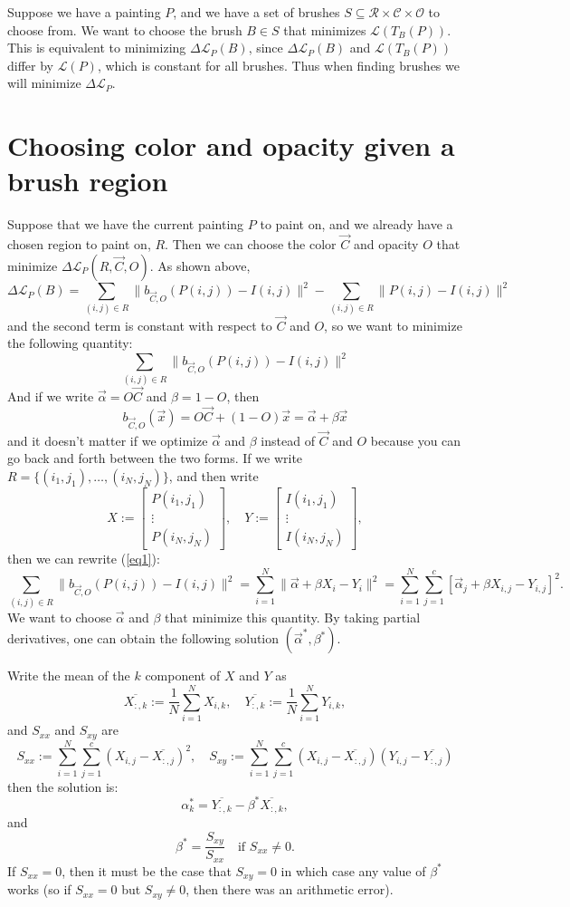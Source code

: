 \documentclass[12pt]{article}
\newcommand{\be}{\begin{equation}}
\newcommand{\ee}{\end{equation}}
\newcommand{\Loss}{\mathcal{L}}
\begin{document}
Suppose we have a painting $P$, and we have a set of brushes $S \subseteq \mathcal{R} \times \mathcal C \times \mathcal O$ to choose from. We want to choose the brush $B \in S$ that minimizes $\mathcal{L}(T_{B}(P))$. This is equivalent to minimizing $\Delta \mathcal{L}_P(B)$, since $\Delta \mathcal{L}_P(B)$ and $\mathcal{L}(T_{B}(P))$ differ by $\mathcal{L}(P)$, which is constant for all brushes. Thus when finding brushes we will minimize $\Delta \Loss_P$.

\section{Choosing color and opacity given a brush region}
Suppose that we have the current painting $P$ to paint on, and we already have a chosen region to paint on, $R$. Then we can choose the color $\vec C$ and opacity $O$ that minimize $\Delta \Loss_P(R,\vec C,O)$. As shown above,
\[
\Delta \mathcal{L}_P(B) = \sum_{(i,j) \in R} \| b_{\vec C,O}(P(i,j)) - I(i,j) \|^2 - \sum_{(i,j) \in R} \| P(i,j) - I(i,j) \|^2
\]
and the second term is constant with respect to $\vec C$ and $O$, so we want to minimize the following quantity:
\be \label{eq1}
\sum_{(i,j) \in R} \| b_{\vec C,O}(P(i,j)) - I(i,j) \|^2
\ee
And if we write $\vec \alpha = O\vec C$ and $\beta = 1-O$, then
\[
b_{\vec C,O}(\vec x) = O \vec C + (1-O) \vec x = \vec \alpha + \beta \vec x
\]
and it doesn't matter if we optimize $\vec \alpha$ and $\beta$ instead of $\vec C$ and $O$ because you can go back and forth between the two forms.
If we write $R = \{ (i_1,j_1), \dots, (i_N,j_N) \}$, and then write
\[
X := \begin{bmatrix}
P(i_1,j_1) \\
\vdots \\
P(i_N,j_N)
\end{bmatrix}, \quad
Y := \begin{bmatrix}
I(i_1,j_1) \\
\vdots \\
I(i_N,j_N)
\end{bmatrix},
\]
then we can rewrite (\ref{eq1}):
\[
\sum_{(i,j) \in R} \| b_{\vec C,O}(P(i,j)) - I(i,j) \|^2
=
\sum_{i=1}^N \| \vec \alpha + \beta X_i - Y_i \|^2
=
\sum_{i=1}^N \sum_{j=1}^c [\vec \alpha_j + \beta X_{i,j} - Y_{i,j} ]^2.
\]
We want to choose $\vec \alpha$ and $\beta$ that minimize this quantity. By taking partial derivatives, one can obtain the following solution $(\vec \alpha^*,\beta^*)$.

Write the mean of the $k$ component of $X$ and $Y$ as
\[
\overline{X_{:,k}} := \frac{1}{N} \sum_{i=1}^N X_{i,k}, \quad
\overline{Y_{:,k}} := \frac{1}{N} \sum_{i=1}^N Y_{i,k},
\]
and $S_{xx}$ and $S_{xy}$ are
\[
S_{xx} := \sum_{i=1}^N \sum_{j=1}^c (X_{i,j} - \overline{X_{:,j}})^2, \quad
S_{xy} := \sum_{i=1}^N \sum_{j=1}^c (X_{i,j} - \overline{X_{:,j}}) (Y_{i,j} - \overline{Y_{:,j}})
\]
then the solution is:
\[
\alpha^*_k = \overline{Y_{:,k}} - \beta^* \overline{X_{:,k}},
\]
and
\[
\beta^* = \frac{S_{xy}}{S_{xx}} \quad \text{if } S_{xx} \neq 0.
\]
If $S_{xx} = 0$, then it must be the case that $S_{xy} = 0$ in which case any value of $\beta^*$ works (so if $S_{xx} = 0$ but $S_{xy} \neq 0$, then there was an arithmetic error).
\end{document}

